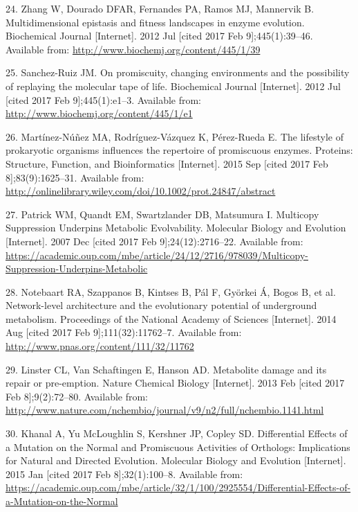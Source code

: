 \documentclass[12pt,twoside]{reedthesis}
\begin{document}
  \hypertarget{ref-zhang_multidimensional_2012}{}
  24. Zhang W, Dourado DFAR, Fernandes PA, Ramos MJ, Mannervik B.
  Multidimensional epistasis and fitness landscapes in enzyme evolution.
  Biochemical Journal {[}Internet{]}. 2012 Jul {[}cited 2017 Feb
  9{]};445(1):39--46. Available from:
  \url{http://www.biochemj.org/content/445/1/39}
  
  \hypertarget{ref-sanchez-ruiz_promiscuity_2012}{}
  25. Sanchez-Ruiz JM. On promiscuity, changing environments and the
  possibility of replaying the molecular tape of life. Biochemical Journal
  {[}Internet{]}. 2012 Jul {[}cited 2017 Feb 9{]};445(1):e1--3. Available
  from: \url{http://www.biochemj.org/content/445/1/e1}
  
  \hypertarget{ref-martinez-nunez_lifestyle_2015}{}
  26. Martínez-Núñez MA, Rodríguez-Vázquez K, Pérez-Rueda E. The lifestyle
  of prokaryotic organisms influences the repertoire of promiscuous
  enzymes. Proteins: Structure, Function, and Bioinformatics
  {[}Internet{]}. 2015 Sep {[}cited 2017 Feb 8{]};83(9):1625--31.
  Available from:
  \url{http://onlinelibrary.wiley.com/doi/10.1002/prot.24847/abstract}
  
  \hypertarget{ref-patrick_multicopy_2007}{}
  27. Patrick WM, Quandt EM, Swartzlander DB, Matsumura I. Multicopy
  Suppression Underpins Metabolic Evolvability. Molecular Biology and
  Evolution {[}Internet{]}. 2007 Dec {[}cited 2017 Feb
  9{]};24(12):2716--22. Available from:
  \url{https://academic.oup.com/mbe/article/24/12/2716/978039/Multicopy-Suppression-Underpins-Metabolic}
  
  \hypertarget{ref-notebaart_network-level_2014}{}
  28. Notebaart RA, Szappanos B, Kintses B, Pál F, Györkei Á, Bogos B, et
  al. Network-level architecture and the evolutionary potential of
  underground metabolism. Proceedings of the National Academy of Sciences
  {[}Internet{]}. 2014 Aug {[}cited 2017 Feb 9{]};111(32):11762--7.
  Available from: \url{http://www.pnas.org/content/111/32/11762}
  
  \hypertarget{ref-linster_metabolite_2013}{}
  29. Linster CL, Van Schaftingen E, Hanson AD. Metabolite damage and its
  repair or pre-emption. Nature Chemical Biology {[}Internet{]}. 2013 Feb
  {[}cited 2017 Feb 8{]};9(2):72--80. Available from:
  \url{http://www.nature.com/nchembio/journal/v9/n2/full/nchembio.1141.html}
  
  \hypertarget{ref-khanal_differential_2015}{}
  30. Khanal A, Yu McLoughlin S, Kershner JP, Copley SD. Differential
  Effects of a Mutation on the Normal and Promiscuous Activities of
  Orthologs: Implications for Natural and Directed Evolution. Molecular
  Biology and Evolution {[}Internet{]}. 2015 Jan {[}cited 2017 Feb
  8{]};32(1):100--8. Available from:
  \url{https://academic.oup.com/mbe/article/32/1/100/2925554/Differential-Effects-of-a-Mutation-on-the-Normal}
  
\end{document}
